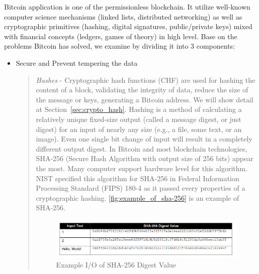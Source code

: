 Bitcoin application is one of the permissionless blockchain.
It utilize well-known computer science mechanisms (linked lists, distributed networking) as well as cryptographic primitives (hashing, digital signatures, public/private keys) mixed with financial concepts (ledgers, games of theory) in high level.
Base on the problems Bitcoin has solved, we examine by dividing it into 3 components:

\begin{itemize}
	\item Secure and Prevent tempering the data

	      \begin{quote}
		      \emph{Hashes} -
		      Cryptographic hash functions (CHF) are used for hashing the content of a block, validating the integrity of data, reduce the size of the message or keys, generating a Bitcoin address. We will show detail at Section~\ref{sec:crypto_hash}.
		      Hashing is a method of calculating a relatively unique fixed-size output (called a message digest, or just digest) for an input of nearly any size (e.g., a file, some text, or an image).
		      Even one single bit change of input will result in a completely different output digest.
		      In Bitcoin and most blockchain technologies, SHA-256 (Secure Hash Algorithm with output size of 256 bits) appear the most. Many computer support hardware level for this algorithm.
		      NIST specified this algorithm for SHA-256 in Federal Information Processing Standard (FIPS) 180-4 as it passed every properties of a cryptographic hashing.
		      \autoref{fig:example_of_sha-256} is an example of SHA-256.

		      \begin{figure}[h!]
			      \centering
			      \includegraphics[width=1\textwidth]{images/example_of_sha-256.png}
			      \caption[Example input and output of SHA-256 Digest Value]{Example I/O of SHA-256 Digest Value}
			      \label{fig:example_of_sha-256}
		      \end{figure}

		      \bigbreak


\end{quote}
\end{itemize}
